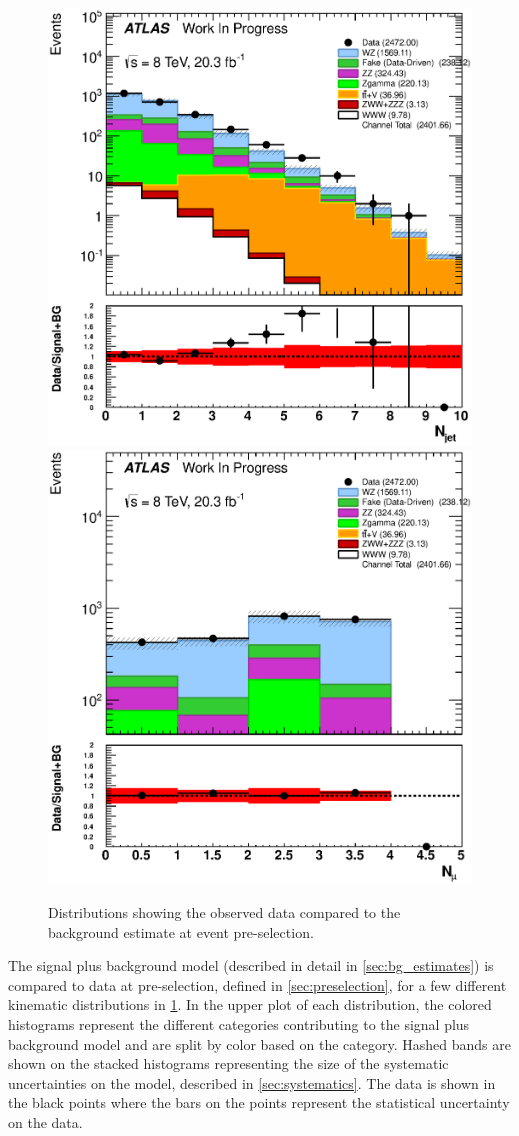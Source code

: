 \begin{figure}[ht!]
\includegraphics[width=0.3\columnwidth]{figures/appendix_signal_selection/Nov24Update_FakeSys_KFacSys_LogY_NoRebin/output/jobs/MxM/DataFull_Rates_May13_FakeRatesExactly2Loose_MuonMxMBJetGt0_ElBJetGt0SubtractPC_MxM/PreselectionNov23_15_physics/weight_all/eps/NJets_histratio.eps}
\includegraphics[width=0.3\columnwidth]{figures/appendix_signal_selection/Nov24Update_FakeSys_KFacSys_LogY_NoRebin/output/jobs/MxM/DataFull_Rates_May13_FakeRatesExactly2Loose_MuonMxMBJetGt0_ElBJetGt0SubtractPC_MxM/PreselectionNov23_15_physics/weight_all/eps/NMuons_histratio.eps}
\caption{Distributions showing the observed data compared to the background estimate at event pre-selection.}
\label{fig:preselection}
\end{figure}
The signal plus background model 
(described in detail in \sec\ref{sec:bg_estimates})
is compared to data at pre-selection, defined in \sec\ref{sec:preselection},
for a few different kinematic distributions 
in \fig\ref{fig:preselection}. In the upper plot of each distribution,
the colored histograms 
represent the different categories contributing to the signal 
plus background model and 
are split by color based on the category. 
Hashed bands are shown on the stacked
histograms representing the size of the systematic uncertainties 
on the model, described in \sec\ref{sec:systematics}.
The data is shown in the black points where the 
bars on the points represent the statistical uncertainty on the data.
